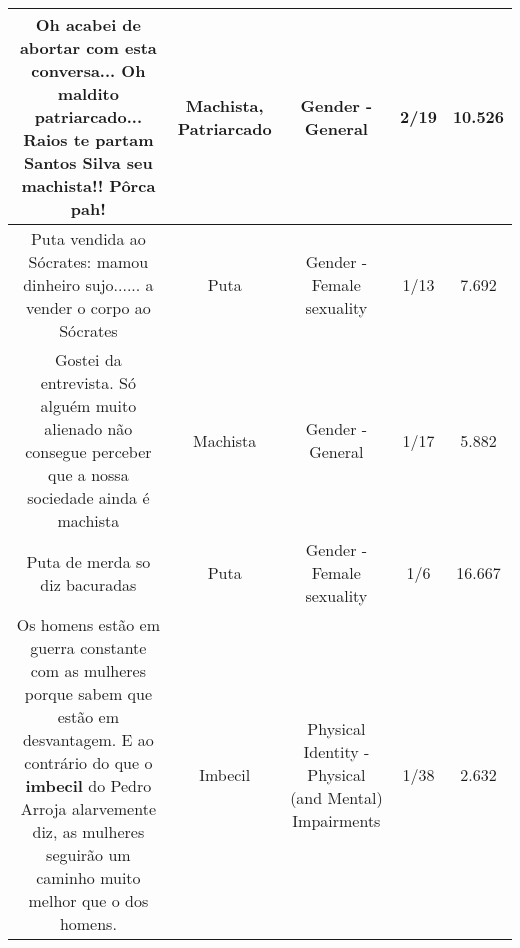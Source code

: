 \documentclass[11pt]{article}
\newlength\mylength
\begin{document}
\begin{center}
\begin{longtable}{|C{.65\mylength}|C{.30\mylength}|C{.12\mylength}|C{.12\mylength}|C{.12\mylength}|}
  \small Oh acabei de abortar com esta conversa... Oh maldito \textbf{patriarcado}... Raios te partam Santos Silva seu \textbf{machista}!! Pôrca pah!\normalsize   & Machista, Patriarcado & Gender - General & 2/19 & 10.526 \\  \hline
  \small Puta vendida ao Sócrates: mamou dinheiro sujo...... a vender o corpo ao Sócrates\normalsize   & Puta & Gender - Female sexuality & 1/13 & 7.692 \\  \hline
  \small Gostei da entrevista. Só alguém muito alienado não consegue perceber que a nossa sociedade ainda é machista\normalsize   & Machista & Gender - General & 1/17 & 5.882 \\  \hline
  \small Puta de merda so diz bacuradas\normalsize   & Puta & Gender - Female sexuality & 1/6 & 16.667 \\  \hline
  \small Os homens estão em guerra constante com as mulheres porque sabem que estão em desvantagem. E ao contrário do que o \textbf{imbecil} do Pedro Arroja alarvemente diz, as mulheres seguirão um caminho muito melhor que o dos homens.\normalsize   & Imbecil & Physical Identity - Physical (and Mental) Impairments & 1/38 & 2.632 \\  \hline
  
\end{longtable}
\end{center}
\end{document}
